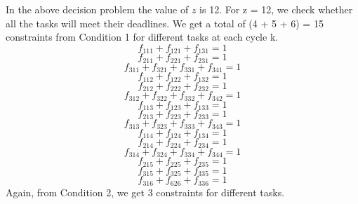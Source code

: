 In the above decision problem the value of $z$ is 12. 
For z = 12, we check whether all the tasks will meet their deadlines.
We get a total of (4 + 5 + 6) = 15 constraints from Condition 1 for different tasks at each cycle k.
\newline
\begin{equation}
 f_{111} + f_{121} + f_{131} = 1
\end{equation}
\begin{equation}
 f_{211} + f_{221} + f_{231} = 1
\end{equation}
\begin{equation}
 f_{311} + f_{321} + f_{331} + f_{341} = 1
\end{equation}
\begin{equation}
 f_{112} + f_{122} + f_{132} = 1
\end{equation}
\begin{equation}
 f_{212} + f_{222} + f_{232} = 1
\end{equation}
\begin{equation} 
 f_{312} + f_{322} + f_{332} + f_{342} = 1
\end{equation}
\begin{equation}
 f_{113} + f_{123} + f_{133} = 1
\end{equation}
\begin{equation}
 f_{213} + f_{223} + f_{233} = 1
\end{equation}
\begin{equation}
 f_{313} + f_{323} + f_{333} + f_{343} = 1
\end{equation}
\begin{equation}
 f_{114} + f_{124} + f_{134} = 1
\end{equation}
\begin{equation}
 f_{214} + f_{224} + f_{234} = 1
\end{equation}
\begin{equation}
 f_{314} + f_{324} + f_{334} + f_{344} = 1
\end{equation}
\begin{equation}
 f_{215} + f_{225} + f_{235} = 1
\end{equation}
\begin{equation}
 f_{315} + f_{325} + f_{335} = 1
\end{equation}
\begin{equation}
 f_{316} + f_{626} + f_{336} = 1
\end{equation}
\newline
Again, from Condition 2, we get 3 constraints for different tasks.

